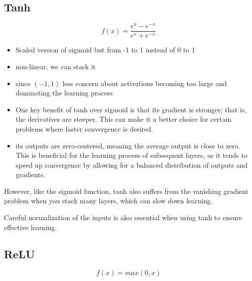 \documentclass[11pt]{article}
\begin{document}
\subsection{Tanh}

\begin{definition}\label{eq:activation-tanh}
    \begin{equation*}
        f(x) = \frac{e^x-e^{-x}}{e^x+e^{-x}}
    \end{equation*}
\end{definition}

\begin{itemize}
    \item Scaled version of sigmoid but from -1 to 1 instead of 0 to 1
    \item non-linear, we can stack it 
    \item since $(-1,1)$ less concern about activations becoming too large and dominating the learning process
    \item One key benefit of tanh over sigmoid is that its gradient is stronger; that is, the derivatives are steeper. This can make it a better choice for certain problems where faster convergence is desired.
    \item its outputs are zero-centered, meaning the average output is close to zero. This is beneficial for the learning process of subsequent layers, as it tends to speed up convergence by allowing for a balanced distribution of outputs and gradients.
\end{itemize}

However, like the sigmoid function, tanh also suffers from the vanishing gradient problem when you stack many layers, which can slow down learning.

Careful normalization of the inputs is also essential when using tanh to ensure effective learning.

\subsection{ReLU}

\begin{definition}\label{eq:activation-relu}
    \begin{equation*}
        f(x) = max(0,x)
    \end{equation*}
\end{definition}
\end{document}
